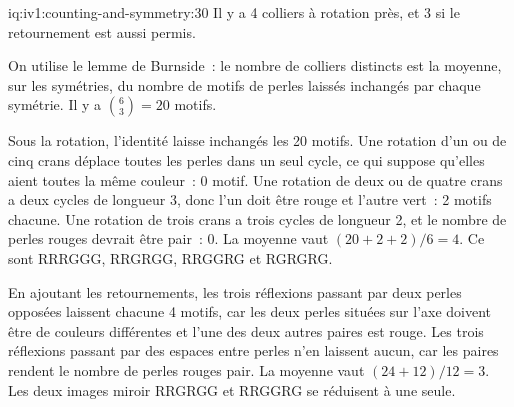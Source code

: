 \begin{solution}{iq:iv1:counting-and-symmetry:30}
Il y a 4 colliers à rotation près, et 3 si le retournement est aussi permis.

On utilise le lemme de Burnside~: le nombre de colliers distincts est la moyenne, sur les symétries, du nombre de motifs de perles laissés inchangés par chaque symétrie. Il y a $\binom{6}{3} = 20$ motifs.

Sous la rotation, l'identité laisse inchangés les 20 motifs. Une rotation d'un ou de cinq crans déplace toutes les perles dans un seul cycle, ce qui suppose qu'elles aient toutes la même couleur~: 0 motif. Une rotation de deux ou de quatre crans a deux cycles de longueur 3, donc l'un doit être rouge et l'autre vert~: 2 motifs chacune. Une rotation de trois crans a trois cycles de longueur 2, et le nombre de perles rouges devrait être pair~: 0. La moyenne vaut $(20 + 2 + 2)/6 = 4$. Ce sont RRRGGG, RRGRGG, RRGGRG et RGRGRG.

En ajoutant les retournements, les trois réflexions passant par deux perles opposées laissent chacune 4 motifs, car les deux perles situées sur l'axe doivent être de couleurs différentes et l'une des deux autres paires est rouge. Les trois réflexions passant par des espaces entre perles n'en laissent aucun, car les paires rendent le nombre de perles rouges pair. La moyenne vaut $(24 + 12)/12 = 3$. Les deux images miroir RRGRGG et RRGGRG se réduisent à une seule.

\end{solution}

